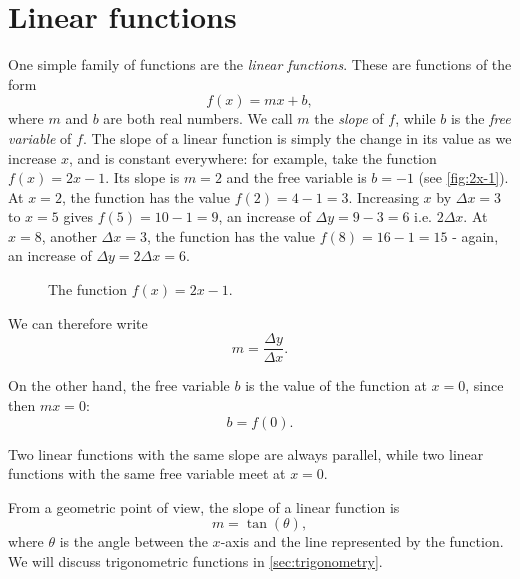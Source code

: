 \section{Linear functions} %
\label{sec:Linear functions}

One simple family of functions are the \emph{linear functions}. These are functions of the form
\begin{equation}
  f(x) = mx+b,
  \label{eq:linear_funcs_def}
\end{equation}
where $m$ and $b$ are both real numbers. We call $m$ the \emph{slope} of $f$, while $b$ is the \emph{free variable} of $f$. The slope of a linear function is simply the change in its value as we increase $x$, and is constant everywhere: for example, take the function $f(x)=2x-1$. Its slope is $m=2$ and the free variable is $b=-1$ (see \autoref{fig:2x-1}). At $x=2$, the function has the value $f(2)=4-1=3$. Increasing $x$ by $\Delta x=3$ to $x=5$ gives $f(5)=10-1=9$, an increase of $\Delta y=9-3=6$ i.e. $2\Delta x$. At $x=8$, another $\Delta x=3$, the function has the value $f(8)=16-1=15$ - again, an increase of $\Delta y=2\Delta x=6$.

\begin{figure}
  \centering
  \caption{The function $f(x)=2x-1$.}
  \label{fig:2x-1}
\end{figure}

We can therefore write
\begin{equation}
  m = \frac{\Delta y}{\Delta x}.
  \label{eq:linear_slope_def}
\end{equation}

On the other hand, the free variable $b$ is the value of the function at $x=0$, since then $mx=0$:
\begin{equation}
  b = f(0).
  \label{eq:linear_free_var}
\end{equation}

Two linear functions with the same slope are always parallel, while two linear functions with the same free variable meet at $x=0$.

From a geometric point of view, the slope of a linear function is
\begin{equation}
  m = \tan\left(\theta\right),
  \label{eq:slope_angle}
\end{equation}
where $\theta$ is the angle between the $x$-axis and the line represented by the function. We will discuss trigonometric functions in \autoref{sec:trigonometry}.
